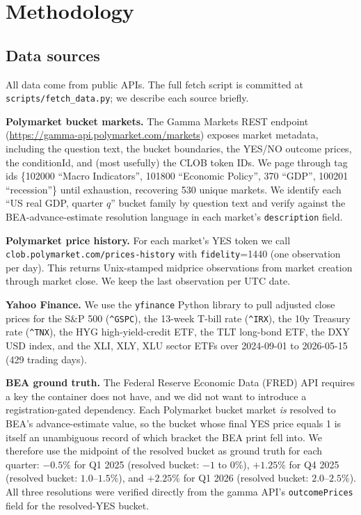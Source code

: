 \documentclass{article}
\begin{document}
\section{Methodology}
\label{sec:method}

\subsection{Data sources}
All data come from public APIs. The full fetch script is committed at
\texttt{scripts/fetch\_data.py}; we describe each source briefly.

\textbf{Polymarket bucket markets.} The Gamma Markets REST endpoint
(\url{https://gamma-api.polymarket.com/markets}) exposes market metadata, including the
question text, the bucket boundaries, the YES/NO outcome prices, the conditionId, and (most
usefully) the CLOB token IDs. We page through tag ids \{102000 ``Macro Indicators'',
101800 ``Economic Policy'', 370 ``GDP'', 100201 ``recession''\} until exhaustion, recovering
530 unique markets. We identify each ``US real GDP, quarter $q$'' bucket family by question
text and verify against the BEA-advance-estimate resolution language in each market's
\texttt{description} field.

\textbf{Polymarket price history.} For each market's YES token we call
\texttt{clob.polymarket.com/prices-history} with \texttt{fidelity}=1440 (one observation
per day). This returns Unix-stamped midprice observations from market creation through
market close. We keep the last observation per UTC date.

\textbf{Yahoo Finance.} We use the \texttt{yfinance} Python library to pull adjusted close
prices for the S\&P 500 (\texttt{\^{}GSPC}), the 13-week T-bill rate (\texttt{\^{}IRX}),
the 10y Treasury rate (\texttt{\^{}TNX}), the HYG high-yield-credit ETF, the TLT long-bond
ETF, the DXY USD index, and the XLI, XLY, XLU sector ETFs over
2024-09-01 to 2026-05-15 (429 trading days).

\textbf{BEA ground truth.} The Federal Reserve Economic Data (FRED) API requires a key the
container does not have, and we did not want to introduce a registration-gated dependency.
Each Polymarket bucket market \emph{is} resolved to BEA's advance-estimate value, so the
bucket whose final YES price equals 1 is itself an unambiguous record of which bracket the
BEA print fell into. We therefore use the midpoint of the resolved bucket as ground truth
for each quarter: $-0.5\%$ for Q1 2025 (resolved bucket: $-1$ to $0\%$), $+1.25\%$ for
Q4 2025 (resolved bucket: $1.0$--$1.5\%$), and $+2.25\%$ for Q1 2026 (resolved bucket:
$2.0$--$2.5\%$). All three resolutions were verified directly from the gamma API's
\texttt{outcomePrices} field for the resolved-YES bucket.
\end{document}
